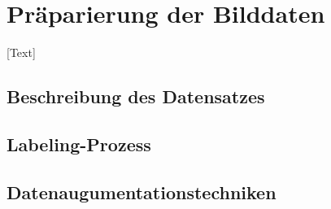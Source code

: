 \chapter{Präparierung der Bilddaten}\label{sec:Bilddaten}
[Text]

\section{Beschreibung des Datensatzes}

\section{Labeling-Prozess}

\section{Datenaugumentationstechniken}

